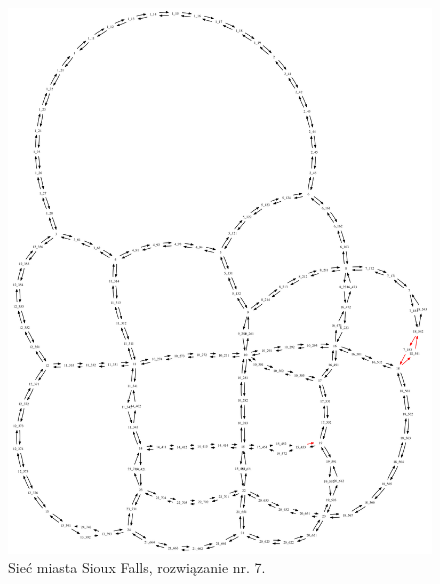 \documentclass[twoside,12pt]{report}
\begin{document}
\begin{figure}[ht]
\centering
\includegraphics[totalheight=0.580\textheight, angle=90]{img/sioux-out/7/network2}
\caption{Sieć miasta Sioux Falls, rozwiązanie nr. 7.}
\label{sioux7}
\end{figure}
\end{document}
